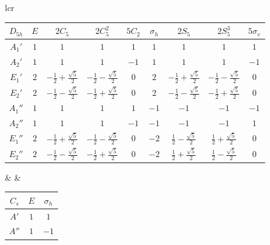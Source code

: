 \documentclass[landscape]{article}
\begin{document}
\begin{center}
\begin{tabular}{lcr}
\begin{minipage}[c]{0.4\linewidth}
                \begin{tabular}{c|cccccccc}
                    $D_{5h}$ & $E$ & $2C_5$ & $2C_5^2$ & $5C_2$ & $\sigma_h$ & $2S_5$ & $2S_5^3$ & $5\sigma_v$\\
                    \hline
                    $A_1'$ & $1$ & $1$ & $1$ & $1$ & $1$ & $1$ & $1$ & $1$\\
                    $A_2'$ & $1$ & $1$ & $1$ & $-1$ & $1$ & $1$ & $1$ & $-1$\\
                    $E_1'$ & $2$ & $-\frac12+\frac{\sqrt{5}}{2}$ & $-\frac12-\frac{\sqrt{5}}{2}$ & $0$ & $2$ & $-\frac12+\frac{\sqrt{5}}{2}$ & $-\frac12-\frac{\sqrt{5}}{2}$ & $0$\\
                    $E_2'$ & $2$ & $-\frac12-\frac{\sqrt{5}}{2}$ & $-\frac12+\frac{\sqrt{5}}{2}$ & $0$ & $2$ & $-\frac12-\frac{\sqrt{5}}{2}$ & $-\frac12+\frac{\sqrt{5}}{2}$ & $0$\\
                    $A_1''$ & $1$ & $1$ & $1$ & $1$ & $-1$ & $-1$ & $-1$ & $-1$\\
                    $A_2''$ & $1$ & $1$ & $1$ & $-1$ & $-1$ & $-1$ & $-1$ & $1$\\
                    $E_1''$ & $2$ & $-\frac12+\frac{\sqrt{5}}{2}$ & $-\frac12-\frac{\sqrt{5}}{2}$ & $0$ & $-2$ & $\frac12-\frac{\sqrt{5}}{2}$ & $\frac12+\frac{\sqrt{5}}{2}$ & $0$\\
                    $E_2''$ & $2$ & $-\frac12-\frac{\sqrt{5}}{2}$ & $-\frac12+\frac{\sqrt{5}}{2}$ & $0$ & $-2$ & $\frac12+\frac{\sqrt{5}}{2}$ & $\frac12-\frac{\sqrt{5}}{2}$ & $0$\\
                \end{tabular}
            \end{minipage}
            & \hspace{3cm} &
            \begin{minipage}[c]{0.3\linewidth}
                \begin{center}
                    \begin{tabular}{c|cc}
                        $C_{s}$ & $E$ & $\sigma_h$\\
                        \hline
                        $A'$ & $1$ & $1$\\
                        $A''$ & $1$ & $-1$
                    \end{tabular}
                    \vspace{1cm}
                    

\end{center}
\end{minipage}
\end{tabular}
\end{center}
\end{document}
